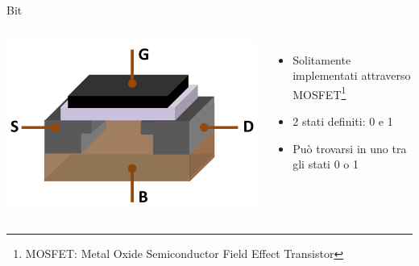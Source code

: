 \documentclass{beamer}
\begin{document}
    \begin{frame}{Bit}
        \begin{columns}
            \includegraphics[width=\textwidth]{gfx/MOSFET_Structure.png}
            \begin{itemize}
                \item Solitamente implementati attraverso MOSFET\footnote{MOSFET: Metal Oxide Semiconductor Field Effect Transistor}
                \item 2 stati definiti: 0 e 1
                \item Può trovarsi in uno tra gli stati 0 o 1
            \end{itemize}
        \end{columns}
    \end{frame}
\end{document}
